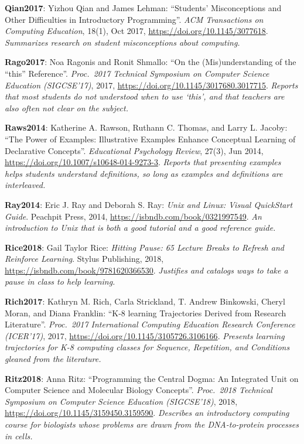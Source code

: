 \textbf{\hypertarget{b:Qian2017}{Qian2017}\label{b:Qian2017}}: Yizhou Qian and James Lehman: ``Students' Misconceptions and Other Difficulties in Introductory Programming''. \emph{ACM Transactions on Computing Education}, 18(1), Oct 2017, \url{https://doi.org/10.1145/3077618}. \emph{Summarizes research on student misconceptions about computing.}

\textbf{\hypertarget{b:Rago2017}{Rago2017}\label{b:Rago2017}}: Noa Ragonis and Ronit Shmallo: ``On the (Mis)understanding of the ``this'' Reference''. \emph{Proc.\ 2017 Technical Symposium on Computer Science Education (SIGCSE'17)}, 2017, \url{https://doi.org/10.1145/3017680.3017715}. \emph{Reports that most students do not understood when to use `this', and that teachers are also often not clear on the subject.}

\textbf{\hypertarget{b:Raws2014}{Raws2014}\label{b:Raws2014}}: Katherine A. Rawson, Ruthann C. Thomas, and Larry L. Jacoby: ``The Power of Examples: Illustrative Examples Enhance Conceptual Learning of Declarative Concepts''. \emph{Educational Psychology Review}, 27(3), Jun 2014, \url{https://doi.org/10.1007/s10648-014-9273-3}. \emph{Reports that presenting examples helps students understand definitions, so long as examples and definitions are interleaved.}

\textbf{\hypertarget{b:Ray2014}{Ray2014}\label{b:Ray2014}}: Eric J. Ray and Deborah S. Ray: \emph{Unix and Linux: Visual QuickStart Guide}. Peachpit Press, 2014, \url{https://isbndb.com/book/0321997549}. \emph{An introduction to Unix that is both a good tutorial and a good reference guide.}

\textbf{\hypertarget{b:Rice2018}{Rice2018}\label{b:Rice2018}}: Gail Taylor Rice: \emph{Hitting Pause: 65 Lecture Breaks to Refresh and Reinforce Learning}. Stylus Publishing, 2018, \url{https://isbndb.com/book/9781620366530}. \emph{Justifies and catalogs ways to take a pause in class to help learning.}

\textbf{\hypertarget{b:Rich2017}{Rich2017}\label{b:Rich2017}}: Kathryn M. Rich, Carla Strickland, T. Andrew Binkowski, Cheryl Moran, and Diana Franklin: ``K-8 learning Trajectories Derived from Research Literature''. \emph{Proc.\ 2017 International Computing Education Research Conference (ICER'17)}, 2017, \url{https://doi.org/10.1145/3105726.3106166}. \emph{Presents learning trajectories for K-8 computing classes for Sequence, Repetition, and Conditions gleaned from the literature.}

\textbf{\hypertarget{b:Ritz2018}{Ritz2018}\label{b:Ritz2018}}: Anna Ritz: ``Programming the Central Dogma: An Integrated Unit on Computer Science and Molecular Biology Concepts''. \emph{Proc.\ 2018 Technical Symposium on Computer Science Education (SIGCSE'18)}, 2018, \url{https://doi.org/10.1145/3159450.3159590}. \emph{Describes an introductory computing course for biologists whose problems are drawn from the DNA-to-protein processes in cells.}

